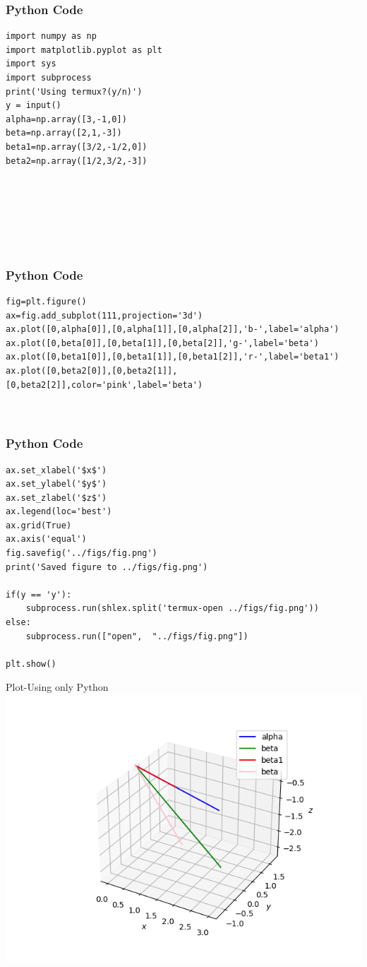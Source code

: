 \documentclass{beamer}
\begin{document}
\begin{frame}[fragile]
    \frametitle{Python Code}
    \begin{lstlisting}
import numpy as np
import matplotlib.pyplot as plt
import sys
import subprocess
print('Using termux?(y/n)')
y = input()
alpha=np.array([3,-1,0])
beta=np.array([2,1,-3])
beta1=np.array([3/2,-1/2,0])
beta2=np.array([1/2,3/2,-3])







\end{lstlisting}
\end{frame}

\begin{frame}[fragile]
    \frametitle{Python Code }
    \begin{lstlisting}
fig=plt.figure()
ax=fig.add_subplot(111,projection='3d')
ax.plot([0,alpha[0]],[0,alpha[1]],[0,alpha[2]],'b-',label='alpha')
ax.plot([0,beta[0]],[0,beta[1]],[0,beta[2]],'g-',label='beta')
ax.plot([0,beta1[0]],[0,beta1[1]],[0,beta1[2]],'r-',label='beta1')
ax.plot([0,beta2[0]],[0,beta2[1]],[0,beta2[2]],color='pink',label='beta')



\end{lstlisting}
\end{frame}
\begin{frame}[fragile]
    \frametitle{Python Code }
    \begin{lstlisting}
ax.set_xlabel('$x$')
ax.set_ylabel('$y$')
ax.set_zlabel('$z$')
ax.legend(loc='best')
ax.grid(True)
ax.axis('equal')
fig.savefig('../figs/fig.png')
print('Saved figure to ../figs/fig.png')

if(y == 'y'):
    subprocess.run(shlex.split('termux-open ../figs/fig.png'))
else:
    subprocess.run(["open",  "../figs/fig.png"])
 
plt.show()
\end{lstlisting}
\end{frame}




\begin{frame}{Plot-Using only Python}
    \centering
    \includegraphics[width=\columnwidth, height=0.8\textheight, keepaspectratio]{figs/fig.png}     
\end{frame}
\end{document}
